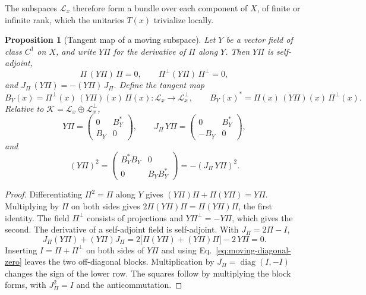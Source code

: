 \documentclass[11pt]{article}
\newtheorem{proposition}{Proposition}[section]
\theoremstyle{definition}
\begin{document}
The subspaces $\mathcal L_x$ therefore form a bundle over each component of $X$, of finite or infinite rank, which the unitaries $T(x)$ trivialize locally.

\begin{proposition}[Tangent map of a moving subspace]
\label{prop:moving-tangent}
Let $Y$ be a vector field of class $C^1$ on $X$, and write $Y\Pi$ for the derivative of $\Pi$ along $Y$. Then $Y\Pi$ is self-adjoint,
\begin{equation}
 \Pi\,(Y\Pi)\,\Pi=0,\qquad \Pi^\perp(Y\Pi)\,\Pi^\perp=0,
 \label{eq:moving-diagonal-zero}
\end{equation}
and $J_\Pi\,(Y\Pi)=-(Y\Pi)\,J_\Pi$. Define the tangent map
\begin{equation}
 B_Y(x)=\Pi^\perp(x)\,(Y\Pi)(x)\,\Pi(x):\mathcal L_x\to\mathcal L_x^\perp,\qquad
 B_Y(x)^*=\Pi(x)\,(Y\Pi)(x)\,\Pi^\perp(x).
 \label{eq:moving-tangent-map}
\end{equation}
Relative to $\mathcal K=\mathcal L_x\oplus\mathcal L_x^\perp$,
\begin{equation}
 Y\Pi=\begin{pmatrix}0&B_Y^*\\B_Y&0\end{pmatrix},\qquad
 J_\Pi\,Y\Pi=\begin{pmatrix}0&B_Y^*\\-B_Y&0\end{pmatrix},
 \label{eq:moving-block-forms}
\end{equation}
and
\begin{equation}
 (Y\Pi)^2=\begin{pmatrix}B_Y^*B_Y&0\\0&B_YB_Y^*\end{pmatrix}=-(J_\Pi\,Y\Pi)^2 .
 \label{eq:moving-squares}
\end{equation}
\end{proposition}
\begin{proof}
Differentiating $\Pi^2=\Pi$ along $Y$ gives $(Y\Pi)\Pi+\Pi(Y\Pi)=Y\Pi$. Multiplying by $\Pi$ on both sides gives $2\Pi(Y\Pi)\Pi=\Pi(Y\Pi)\Pi$, the first identity. The field $\Pi^\perp$ consists of projections and $Y\Pi^\perp=-Y\Pi$, which gives the second. The derivative of a self-adjoint field is self-adjoint. With $J_\Pi=2\Pi-I$,
\[
 J_\Pi(Y\Pi)+(Y\Pi)J_\Pi=2\bigl[\Pi(Y\Pi)+(Y\Pi)\Pi\bigr]-2\,Y\Pi=0 .
\]
Inserting $I=\Pi+\Pi^\perp$ on both sides of $Y\Pi$ and using Eq.~\eqref{eq:moving-diagonal-zero} leaves the two off-diagonal blocks. Multiplication by $J_\Pi=\operatorname{diag}(I,-I)$ changes the sign of the lower row. The squares follow by multiplying the block forms, with $J_\Pi^2=I$ and the anticommutation.
\end{proof}
\end{document}
